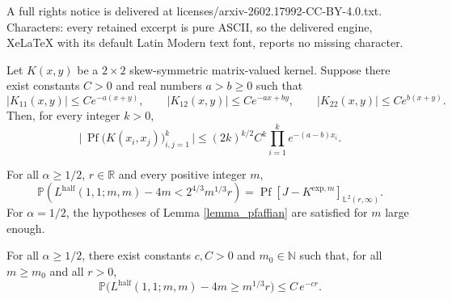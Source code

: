 \documentclass[10pt,a4paper]{amsart}
\newcommand{\Lhalf}{L^{\mathrm{half}}}
\newcommand{\N}{\mathbb{N}}
\newcommand{\Prob}{\mathbb{P}}
\newcommand{\R}{\mathbb{R}}
\begin{document}
A full rights notice is delivered at licenses/arxiv-2602.17992-CC-BY-4.0.txt. Characters: every retained excerpt is pure ASCII, so the delivered engine, XeLaTeX with its default Latin Modern text font, reports no missing character.
\begin{lemma}\label{lemma_pfaffian}
Let \(K(x,y)\) be a \(2\times 2\) skew-symmetric matrix-valued kernel.
Suppose there exist constants \(C>0\) and real numbers \(a>b\ge 0\) such that
\[
|K_{11}(x,y)| \le C e^{-a(x+y)}, \qquad
|K_{12}(x,y)| \le C e^{-a x + b y}, \qquad
|K_{22}(x,y)| \le C e^{b(x+y)}.
\]
Then, for every integer \(k > 0\),
\[
\bigl|\,\operatorname{Pf}\!\big(K(x_i,x_j)\big)_{i,j=1}^k\,\bigr|
\le (2k)^{k/2} C^k \prod_{i=1}^{k} e^{-(a-b)x_i}.
\]
\end{lemma}

\begin{proposition}\label{prop:pfaffian_schur}
For all $\alpha \geq 1/2$, $r \in \R$ and every positive integer $m$, 
    \begin{equation}
        \Prob\left(\Lhalf(1,1;m,m) -4m < 2^{4/3}m^{1/3}r\right) = \operatorname{Pf}[J-K^{\text{exp}, m}]_{\mathbb{L}^2(r,\infty)}.
    \end{equation}
For $\alpha = 1/2$, the hypotheses of Lemma \ref{lemma_pfaffian} are satisfied for $m$ large enough.
\end{proposition}

\begin{proposition}\label{prop_upper_tail}
For all $\alpha \geq 1/2$, there exist constants $c, C > 0$ and $m_0 \in \N$ such that, for all $m \geq m_0$ and all $r > 0$,
\[
\Prob\big(\Lhalf(1,1;m,m) - 4m \ge m^{1/3} r\big)
\le C \, e^{-c r}.
\]
\end{proposition}
\end{document}
